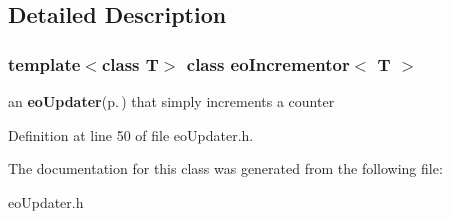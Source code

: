\subsection{Detailed Description}
\subsubsection*{template$<$class T$>$ class eo\-Incrementor$<$ T $>$}

an {\bf eo\-Updater}{\rm (p.\,\pageref{classeo_updater})} that simply increments a counter 



Definition at line 50 of file eo\-Updater.h.

The documentation for this class was generated from the following file:\begin{CompactItemize}
\item 
eo\-Updater.h\end{CompactItemize}
